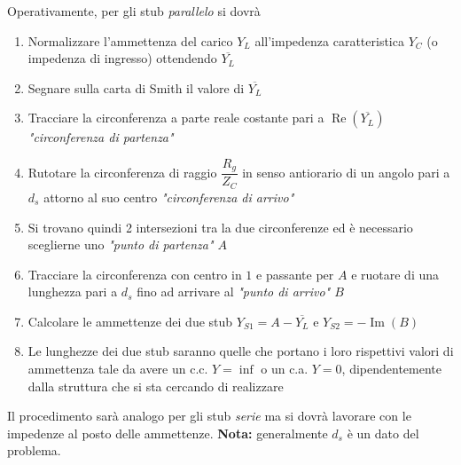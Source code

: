 \documentclass{article}
\begin{document}
Operativamente, per gli stub \textit{parallelo} si dovrà
\begin{enumerate}
	\item Normalizzare l'ammettenza del carico \(Y_L\) all'impedenza caratteristica \(Y_C\) (o impedenza di ingresso) ottendendo \(\overline{Y_L}\)
	\item Segnare sulla carta di Smith il valore di \(\overline{Y_L}\)
	\item Tracciare la circonferenza a parte reale costante pari a \(\operatorname{Re}(\overline{Y_L}) \) \textit{"circonferenza di partenza"}
	\item Rutotare la circonferenza di raggio \(\dfrac{R_g}{Z_C}\) in senso antiorario di un angolo pari a \(d_s\) attorno al suo centro \textit{"circonferenza di arrivo"}
	\item Si trovano quindi 2 intersezioni tra la due circonferenze ed è necessario sceglierne uno \textit{"punto di partenza" \(A\)}
	\item Tracciare la circonferenza con centro in \(1\) e passante per \(A\) e ruotare di una lunghezza pari a \(d_s\) fino ad arrivare al \textit{"punto di arrivo" \(B\)}
	\item Calcolare le ammettenze dei due stub \(Y_{S1} = A - \overline{Y_L}\) e \(Y_{S2} = -\operatorname{Im}(B) \)
	\item Le lunghezze dei due stub saranno quelle che portano i loro rispettivi valori di ammettenza tale da avere un c.c. \( Y = \inf \) o un c.a. \( Y = 0 \), dipendentemente dalla struttura che si sta cercando di realizzare
\end{enumerate}
Il procedimento sarà analogo per gli stub \textit{serie} ma si dovrà lavorare con le impedenze al posto delle ammettenze.
\textbf{Nota:} generalmente \(d_s\) è un dato del problema.
\end{document}
